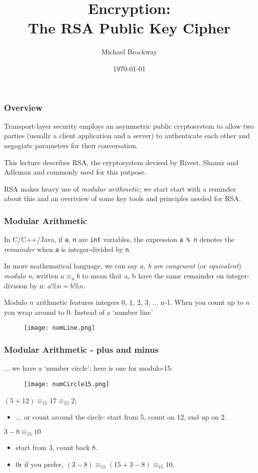 \documentclass[10pt, hyperref={pdfpagelabels=false}]{beamer}
\title{Encryption:\\The RSA Public Key Cipher}
\author{Michael Brockway}
\date{\today}
\begin{document}
\begin{frame}
\titlepage
\end{frame}

\begin{frame}
\frametitle{Overview}
Transport-layer security employs an asymmetric public cryptosystem to allow two parties (usually a client application and a server) to authenticate each other and negogiate parameters for their conversation.

This lecture describes RSA, the cryptosystem devised by Rivest, Shamir and Adleman and commonly used for this putpose.

RSA makes heavy use of \emph{modular arithmetic}; we start start with a reminder about this and an overiview of some key tools and principles needed for RSA.
\end{frame}

\begin{frame}
\frametitle{Modular Arithmetic}
In C/C++/Java, if \texttt{\color{blue}a}, \texttt{\color{blue}n} are \texttt{\color{blue}int} variables, the expression \texttt{\color{blue}a \% n} denotes the \emph{remainder} when \texttt{\color{blue}a} is integer-divided by \texttt{\color{blue}n}.

In more mathematical language, we can say \emph{\color{blue}a, b are congruent} (or \emph{\color{blue}equivalent}) \emph{\color{blue}modulo n}, written {\color{blue}$a \equiv_n b$} to mean that a, b have the same remainder on integer-division by n: $a \% n = b \%n$.

Modulo $n$ arithmetic features integers 0, 1, 2, 3, ... n-1. When you count up to $n$ you wrap around to 0. Instead of a `number line'
\begin{figure}
\texttt{[image: numLine.png]}
\end{figure}
\end{frame}

\begin{frame}
\frametitle{Modular Arithmetic - plus and minus}
... we have a `number circle': here is one for modulo-15:
\begin{figure}
\texttt{[image: numCircle15.png]}
\end{figure}

$(5 + 12) \equiv_{15} 17 \equiv_{15} 2$;
\begin{itemize}
\item ... or count around the circle: start from 5, count on 12, end up on 2.
\end{itemize}

$3 - 8 \equiv_{15} 10$
\begin{itemize}
\item start from 3, count back 8.
\item 0r if you prefer, $(3 - 8) \equiv_{15} (15 + 3 - 8) \equiv_{15} 10$.
\end{itemize}
\end{frame}
\end{document}
